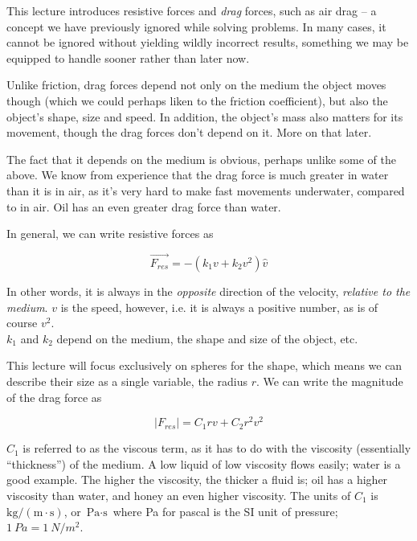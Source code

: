 This lecture introduces resistive forces and \emph{drag} forces, such as air drag -- a concept we have previously ignored while solving problems. In many cases, it cannot be ignored without yielding wildly incorrect results, something we may be equipped to handle sooner rather than later now.

Unlike friction, drag forces depend not only on the medium the object moves though (which we could perhaps liken to the friction coefficient), but also the object's shape, size and speed. In addition, the object's mass also matters for its movement, though the drag forces don't depend on it. More on that later.

The fact that it depends on the medium is obvious, perhaps unlike some of the above. We know from experience that the drag force is much greater in water than it is in air, as it's very hard to make fast movements underwater, compared to in air. Oil has an even greater drag force than water.

In general, we can write resistive forces as

\begin{equation}
\vec{F_{res}} = -\left( k_1 v + k_2 v^2 \right) \hat{v}
\end{equation}

In other words, it is always in the \emph{opposite} direction of the velocity, \emph{relative to the medium}. $v$ is the speed, however, i.e. it is always a positive number, as is of course $v^2$.\\
$k_1$ and $k_2$ depend on the medium, the shape and size of the object, etc.

This lecture will focus exclusively on spheres for the shape, which means we can describe their size as a single variable, the radius $r$. We can write the magnitude of the drag force as

\begin{equation}
|F_{res}| = C_1 r v + C_2 r^2 v^2
\end{equation}

$C_1$ is referred to as the viscous term, as it has to do with the viscosity (essentially ``thickness'') of the medium. A low liquid of low viscosity flows easily; water is a good example. The higher the viscosity, the thicker a fluid is; oil has a higher viscosity than water, and honey an even higher viscosity. The units of $C_1$ is $\text{kg}/(\text{m} \cdot \text{s})$, or $\text{Pa} \cdot \text{s}$ where Pa for pascal is the SI unit of pressure; $\SI{1}{Pa} = \SI{1}{N/m^2}$.

